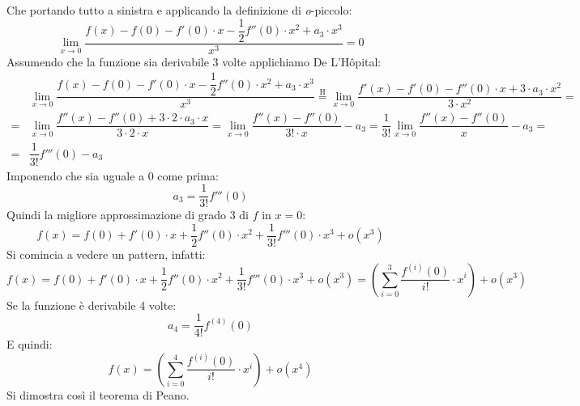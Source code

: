 Che portando tutto a sinistra e applicando la definizione di 
\textit{o}-piccolo:
\begin{equation*}
	\lim_{x \to 0} \dfrac{f(x) - f(0) - f'(0) \cdot x - \dfrac{1}{2} f''(0) 
    \cdot x^2 + a_3 \cdot x^3}{x^3} = 0
\end{equation*}
Assumendo che la funzione sia derivabile 3 volte applichiamo De L'Hôpital:
\begin{align*}
	&\lim_{x \to 0} \dfrac{f(x) - f(0) - f'(0) \cdot x - \dfrac{1}{2} f''(0) 
    \cdot x^2 + a_3 \cdot x^3}{x^3} \stackrel{\text{H}}{=} \lim_{x \to 0} 
    \dfrac{f'(x) - f'(0) - f''(0) \cdot x + 3 \cdot a_3 \cdot x^2}{3 \cdot 
    x^2} = \\[10pt]
	= &\lim_{x \to 0} \dfrac{f''(x) - f''(0) + 3 \cdot 2 \cdot a_3 \cdot x}{3 
    \cdot 2 \cdot x} = \lim_{x \to 0} \dfrac{f''(x) - f''(0)}{3! \cdot x} - a_3 
    = \dfrac{1}{3!} \lim_{x \to 0} \dfrac{f''(x) - f''(0)}{x} - a_3 = \\[10pt]
	= &\dfrac{1}{3!} f'''(0) - a_3
\end{align*}
Imponendo che sia uguale a 0 come prima:
\begin{equation*}
	a_3 = \dfrac{1}{3!} f'''(0)
\end{equation*}
Quindi la migliore approssimazione di grado 3 di $f$ in $x = 0$:
\begin{equation*}
	f(x) = f(0) + f'(0) \cdot x + \dfrac{1}{2} f''(0) \cdot x^2 + \dfrac{1}{3!} 
    f'''(0) \cdot x^3 + o(x^3)
\end{equation*}
Si comincia a vedere un pattern, infatti:
\begin{equation*}
	f(x) = f(0) + f'(0) \cdot x + \dfrac{1}{2} f''(0) \cdot x^2 + \dfrac{1}{3!} 
    f'''(0) \cdot x^3 + o(x^3) = \left( \sum \limits_{i = 0}^3 
    \dfrac{f^{(i)}(0)}{i!} \cdot x^i \right) + o(x^3)
\end{equation*}
Se la funzione è derivabile 4 volte:
\begin{equation*}
	a_4 = \dfrac{1}{4!} f^{(4)}(0)
\end{equation*}
E quindi:
\begin{equation*}
	f(x) = \left( \sum \limits_{i = 0}^4 \dfrac{f^{(i)}(0)}{i!} \cdot x^i 
    \right) + o(x^4)
\end{equation*}
Si dimostra così il teorema di Peano.

